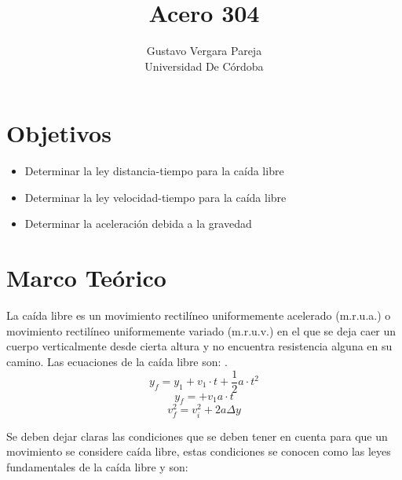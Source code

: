 \documentclass[11pt,twocolumn]{article}
\title{Acero 304 }
\author{Gustavo Vergara Pareja  \\ Universidad De Córdoba}
\begin{document}
\section{Objetivos}
\begin{itemize}
    \item Determinar la ley distancia-tiempo para la caída libre
    
    \item Determinar la ley velocidad-tiempo para la caída libre
    \item Determinar la aceleración debida a la gravedad
    
\end{itemize}

\section{Marco Teórico}

La caída libre es un movimiento rectilíneo uniformemente acelerado (m.r.u.a.) o movimiento rectilíneo uniformemente variado (m.r.u.v.) en el que se deja caer un cuerpo verticalmente desde cierta altura y no encuentra resistencia alguna en su camino. Las ecuaciones de la caída libre son: \cite{ref_1}.\\

$$y_{f}=y_{1}+v_{1}\cdot t+\frac{1}{2}a\cdot t^{2}$$
$$y_{f}=+v_{1}a\cdot t$$
$$v_{f}^{2}=v_{i}^{2}+2a\Delta y$$

Se deben dejar claras las condiciones que se deben tener en cuenta para que un movimiento se considere caída libre, estas condiciones se conocen como las leyes fundamentales de la caída libre y son:\cite{ref_2}\\
\end{document}
